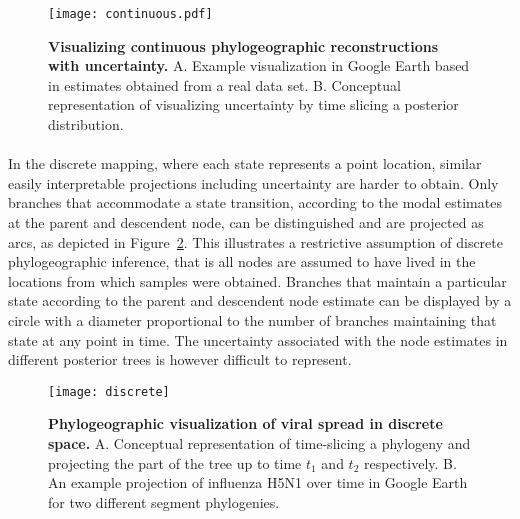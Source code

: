\begin{figure}[H]
\centering
\texttt{[image: continuous.pdf]}
\caption{
{ \footnotesize 
{\bf Visualizing continuous phylogeographic reconstructions with uncertainty.} 
A. Example visualization in Google Earth based in estimates obtained from a real data set. B. Conceptual representation of visualizing uncertainty by time slicing a posterior distribution.
} %
}
\label{fig:cont}
\end{figure}


\paragraph{}
In the discrete mapping, where each state represents a point location, similar easily interpretable projections including uncertainty are harder to obtain.
Only branches that accommodate a state transition, according to the modal estimates at the parent and descendent node, can be distinguished and are projected as arcs, as depicted in Figure~\ref{fig:discrete}.
This illustrates a restrictive assumption of discrete phylogeographic inference, that is all nodes are assumed to have lived in the locations from which samples were obtained.
Branches that maintain a particular state according to the parent and descendent node estimate can be displayed by a circle with a diameter proportional to the number of branches maintaining that state at any point in time.
The uncertainty associated with the node estimates in different posterior trees is however difficult to represent.

\begin{figure}[H]
\centering
\texttt{[image: discrete]}
\caption{
{ \footnotesize 
{\bf Phylogeographic visualization of viral spread in discrete space.} 
A. Conceptual representation of time-slicing a phylogeny and projecting the part of the tree up to time $t_{1}$ and $t_{2}$ respectively. 
B. An example projection of influenza H5N1 over time in Google Earth for two different segment phylogenies. %
} %
}
\label{fig:discrete}
\end{figure}

